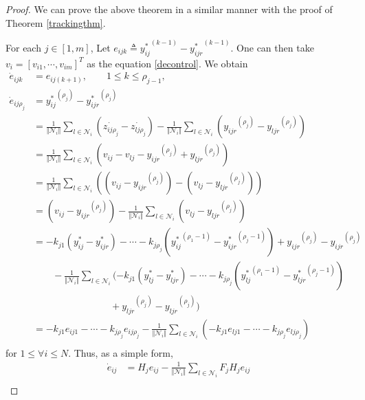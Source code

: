 \documentclass[11pt, a4paper, oneside, openany, reqno]{book}
\theoremstyle{definition}
\theoremstyle{remark}
\numberwithin{equation}{chapter} %
\newcommand{\NBR}{\mathcal{N}}
\begin{document}
\begin{proof}
	We can prove the above theorem in a similar manner with the proof of Theorem \ref{trackingthm}.

	For each $ j \in \left[ 1,m \right] $, 
	Let $ e_{ijk} \triangleq {y_{ij}^*}^{(k-1)}-{y_{ijr}^*}^{(k-1)} $. 
	One can then take $ v_i =\left[ v_{i1}, \cdots, v_{im} \right]^T $ as the equation \eqref{decontrol}. 
	We obtain		
	\begin{equation*}\begin{split}
	\dot{e}_{ijk} &= e_{ij(k+1)} , \qquad 1\leq k \leq \rho_{j-1}, \\
	\dot{e}_{ij\rho_j} &= {y_{ij}^*}^{(\rho_j)}-{y_{ijr}^*}^{(\rho_j)} \\
	&=  \frac{1}{\Vert \NBR_i \Vert } \sum_{l \in \NBR_i}( \dot{z_{ij\rho_j}} - \dot{z_{lj\rho_j}})	
	   -\frac{1}{\Vert \NBR_i \Vert } \sum_{l \in \NBR_i}({y_{ijr}}^{(\rho_j)} - {y_{ljr}}^{(\rho_j)}) \\	
	&=  \frac{1}{\Vert \NBR_i \Vert } \sum_{l \in \NBR_i}
		( v_{ij} - v_{lj} - {y_{ijr}}^{(\rho_j)} + {y_{ljr}}^{(\rho_j)} ) \\		
	&=  \frac{1}{\Vert \NBR_i \Vert } \sum_{l \in \NBR_i}
		( (v_{ij} - {y_{ijr}}^{(\rho_j)})- (v_{lj}  - {y_{ljr}}^{(\rho_j)}) ) \\			
	&=  (v_{ij} - {y_{ijr}}^{(\rho_j)} )
		-\frac{1}{\Vert \NBR_i \Vert } \sum_{l \in \NBR_i} (v_{lj}  - {y_{ljr}}^{(\rho_j)}) \\
	&= -k_{j1}(y_{ij}^* - y_{ijr}^* ) - \cdots - k_{j\rho_j} ({y_{ij}^*}^{(\rho_1 -1)} 
		- {y_{ijr}^*}^{(\rho_j -1)}) + {y_{ijr}}^{(\rho_j)}  -{y_{ijr}}^{(\rho_j)}  \\
		&\qquad -\frac{1}{\Vert \NBR_i \Vert } \sum_{l \in \NBR_i} 
		(-k_{j1}(y_{lj}^* - y_{ljr}^* ) - \cdots - k_{j\rho_j} ({y_{lj}^*}^{(\rho_1 -1)} 	
		- {y_{ljr}^*}^{(\rho_j -1)}) 
		\\ &\qquad\qquad \qquad\qquad + {y_{ljr}}^{(\rho_j)}  -{y_{ljr}}^{(\rho_j)} ) \\
	&= -k_{j1} e_{ij1} - \cdots - k_{j\rho_j} e_{ij\rho_j} 
		-\frac{1}{\Vert \NBR_i \Vert } \sum_{l \in \NBR_i} 
		(-k_{j1} e_{lj1} - \cdots - k_{j\rho_j} e_{lj\rho_j} ) \\
	\end{split}\end{equation*}		
	for $1 \leq \forall i \leq N$. Thus, as a simple form,
	\begin{equation}\begin{split}
		\dot{e}_{ij} 
		&= H_j e_{ij} -\frac{1}{\Vert \NBR_i \Vert } \sum_{l \in \NBR_i} F_j H_j e_{ij} \\

\end{split}
\end{equation}
\end{proof}
\end{document}
